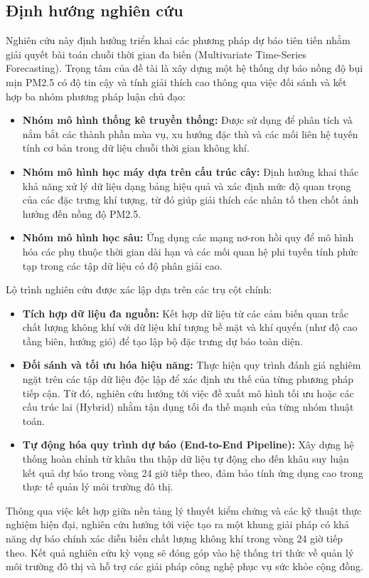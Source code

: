    \subsection{Định hướng nghiên cứu}
    Nghiên cứu này định hướng triển khai các phương pháp dự báo tiên tiến nhằm giải quyết bài toán chuỗi thời gian đa biến (Multivariate Time-Series Forecasting). Trọng tâm của đề tài là xây dựng một hệ thống dự báo nồng độ bụi mịn PM2.5 có độ tin cậy và tính giải thích cao thông qua việc đối sánh và kết hợp ba nhóm phương pháp luận chủ đạo:
    \begin{itemize}
        \item \textbf{Nhóm mô hình thống kê truyền thống:} Được sử dụng để phân tích và nắm bắt các thành phần mùa vụ, xu hướng đặc thù và các mối liên hệ tuyến tính cơ bản trong dữ liệu chuỗi thời gian không khí.
        \item \textbf{Nhóm mô hình học máy dựa trên cấu trúc cây:} Định hướng khai thác khả năng xử lý dữ liệu dạng bảng hiệu quả và xác định mức độ quan trọng của các đặc trưng khí tượng, từ đó giúp giải thích các nhân tố then chốt ảnh hưởng đến nồng độ PM2.5.
        \item \textbf{Nhóm mô hình học sâu:} Ứng dụng các mạng nơ-ron hồi quy để mô hình hóa các phụ thuộc thời gian dài hạn và các mối quan hệ phi tuyến tính phức tạp trong các tập dữ liệu có độ phân giải cao.
    \end{itemize}
    Lộ trình nghiên cứu được xác lập dựa trên các trụ cột chính:
    \begin{itemize}
        \item \textbf{Tích hợp dữ liệu đa nguồn:} Kết hợp dữ liệu từ các cảm biến quan trắc chất lượng không khí với dữ liệu khí tượng bề mặt và khí quyển (như độ cao tầng biên, hướng gió) để tạo lập bộ đặc trưng dự báo toàn diện.
        \item \textbf{Đối sánh và tối ưu hóa hiệu năng:} Thực hiện quy trình đánh giá nghiêm ngặt trên các tập dữ liệu độc lập để xác định ưu thế của từng phương pháp tiếp cận. Từ đó, nghiên cứu hướng tới việc đề xuất mô hình tối ưu hoặc các cấu trúc lai (Hybrid) nhằm tận dụng tối đa thế mạnh của từng nhóm thuật toán.
        \item \textbf{Tự động hóa quy trình dự báo (End-to-End Pipeline):} Xây dựng hệ thống hoàn chỉnh từ khâu thu thập dữ liệu tự động cho đến khâu suy luận kết quả dự báo trong vòng 24 giờ tiếp theo, đảm bảo tính ứng dụng cao trong thực tế quản lý môi trường đô thị.
    \end{itemize}
    Thông qua việc kết hợp giữa nền tảng lý thuyết kiểm chứng và các kỹ thuật thực nghiệm hiện đại, nghiên cứu hướng tới việc tạo ra một khung giải pháp có khả năng dự báo chính xác diễn biến chất lượng không khí trong vòng 24 giờ tiếp theo. Kết quả nghiên cứu kỳ vọng sẽ đóng góp vào hệ thống tri thức về quản lý môi trường đô thị và hỗ trợ các giải pháp công nghệ phục vụ sức khỏe cộng đồng.

